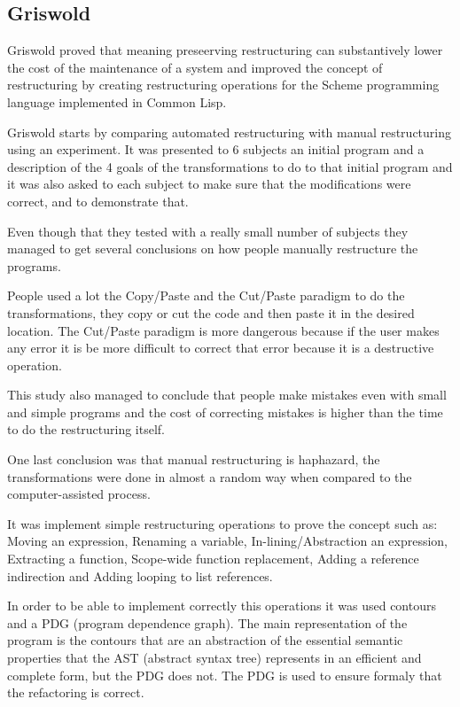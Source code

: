 
\subsection{Griswold}
Griswold \cite{griswold1991program} proved that meaning preseerving restructuring can substantively lower the cost of the maintenance of a system and improved the concept of restructuring by creating restructuring operations for the Scheme programming language implemented in Common Lisp.


Griswold starts by comparing automated restructuring with manual restructuring using an experiment. It was presented to 6 subjects an initial program and a description of the 4 goals of the transformations to do to that initial program and it was also asked to each subject to make sure that the modifications were correct, and to demonstrate that. 

Even though that they tested with a really small number of subjects they managed to get several conclusions on how people manually restructure the programs.


People used a lot the Copy/Paste and the Cut/Paste paradigm to do the transformations, they copy or cut the code and then paste it in the desired location.
The Cut/Paste paradigm is more dangerous because if the user makes any error it is be more difficult to correct that error because it is a destructive operation.


This study also managed to conclude that people make mistakes even with small and simple programs and the cost of correcting mistakes is higher than the time to do the restructuring itself.

One last conclusion was that manual restructuring is haphazard, the transformations were done in almost a random way when compared to the computer-assisted process.


It was implement simple restructuring operations to prove the concept such as: Moving an expression, Renaming a variable, In-lining/Abstraction an expression, Extracting a function, Scope-wide function replacement, Adding a reference indirection and Adding looping to list references.


In order to be able to implement correctly this operations it was used contours and a PDG (program dependence graph). 
The main representation of the program is the contours that are an abstraction of the essential semantic properties that the AST (abstract syntax tree) represents in an efficient and complete form, but the PDG does not.
The PDG is used to ensure formaly that the refactoring is correct.

